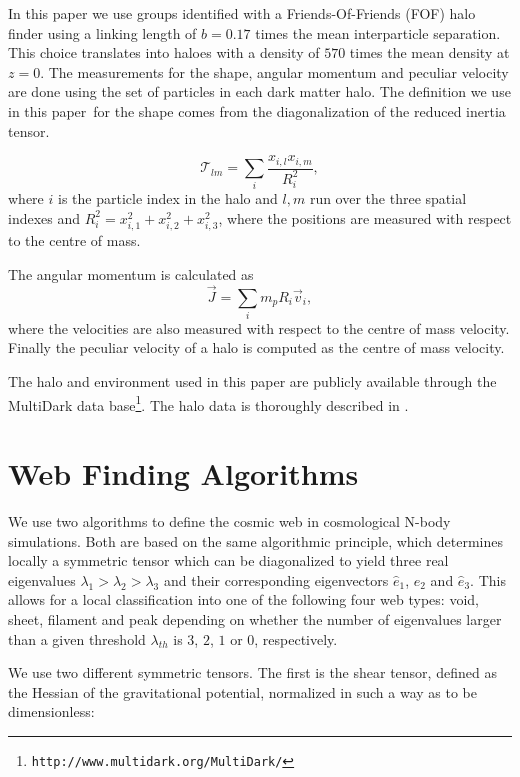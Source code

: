 \documentclass[useAMS,usenatbib]{mn2e}
\newcommand{\documentname}{paper~}
\begin{document}
In this paper we use groups identified with a Friends-Of-Friends (FOF) halo
finder using a linking length of $b=0.17$ times the mean interparticle
separation. This choice translates into haloes with a density of $570$
times the mean density at $z=0$. The measurements for the shape,
angular momentum and peculiar velocity are done using the set of
particles in each dark matter halo. The definition we use in this
\documentname for the shape comes from the diagonalization of the
reduced inertia tensor.

\begin{equation}
{\mathcal T}_{lm} = \sum_{i}\frac{x_{i,l}x_{i,m}}{R_i^2},
\end{equation}
where $i$ is the particle index in the halo and $l,m$ run over the
three spatial indexes  and $R_i^2 = x_{i,1}^2 + x_{i,2}^2 +
x_{i,3}^2$, where the positions are measured with respect to the
centre of mass.

The angular momentum is calculated as
\begin{equation}
\vec{J} = \sum_{i}m_p{R_i}\vec{v}_i,
\end{equation}
where the velocities are also measured with respect to the centre of
mass velocity. Finally the peculiar velocity of a halo is computed as
the centre of mass velocity.

The halo and environment used in this paper are publicly available through the
MultiDark data base\footnote{\texttt{http://www.multidark.org/MultiDark/}}. The
halo data is thoroughly described in \cite{2013AN....334..691R}.



\section{Web Finding Algorithms}
\label{sec:algorithms}

We use two algorithms to define the cosmic web in cosmological N-body
simulations. Both are based on the same algorithmic principle, which
determines locally a symmetric tensor which can be diagonalized to yield
three real eigenvalues $\lambda_1>\lambda_2>\lambda_3$ and their
corresponding eigenvectors $\hat{e}_{1}$, $\hat{e}_2$ and
$\hat{e}_3$. This allows for a local classification into one of the 
following four web types: void, sheet, filament and peak depending
on whether the number of eigenvalues larger than a given threshold
$\lambda_{th}$ is $3$, $2$, $1$ or $0$, respectively.

We use two different symmetric tensors. The first is the shear tensor,
defined as the Hessian of the gravitational potential, normalized in
such a way as to be dimensionless:
\end{document}
